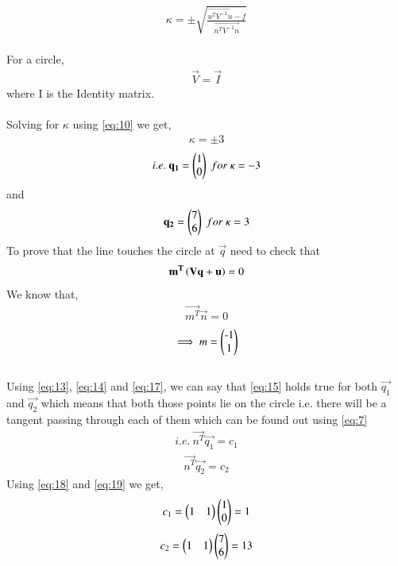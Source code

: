 \documentclass[journal,12pt,twocolumn]{IEEEtran}
\begin{document}
\begin{align}
\kappa = \pm \sqrt{\frac{\vec{u^TV^{-1}u}-f}{\vec{n^TV^{-1}n}}} \label{eq:10}
\end{align}\\
For a circle,
\begin{align}
\vec{V} = \vec{I} \label{eq:11}
\end{align}
where I is the Identity matrix.\\\\
Solving for $\kappa$ using \eqref{eq:10} we get,
\begin{align}
\kappa = \pm 3 \label{eq:12}
\end{align}
\begin{align}
i.e. \ \mathbf{q_1} = \begin{pmatrix}1 \\ 0\end{pmatrix} \ for \ \kappa = -3 \label{eq:13}
\end{align}
and
\begin{align}
\mathbf{q_2} = \begin{pmatrix}7 \\ 6\end{pmatrix} \ for \ \kappa = 3 \label{eq:14}
\end{align}
To prove that the line touches the circle at $\vec{q}$ need to check that
\begin{align}
\mathbf{m^T}\left(\mathbf{V}\mathbf{q}+\mathbf{u}\right) = 0 \label{eq:15}
\end{align}
We know that,
\begin{align}
\vec{m^T}\vec{n} = 0 \label{eq:16}
\end{align}
\begin{align}
\implies m = \myvec{$-$1 \\ 1} \label{eq:17} 
\end{align}\\
Using \eqref{eq:13}, \eqref{eq:14} and \eqref{eq:17}, we can say that \eqref{eq:15} holds true for both $\vec{q_1}$ and $\vec{q_2}$ which means that both those points lie on the circle i.e. there will be a tangent passing through each of them which can be found out using \eqref{eq:7}
\begin{align}
i.e. \ \vec{n^T}\vec{q_1} = c_1 \label{eq:18}
\end{align}
\begin{align}
\vec{n^T}\vec{q_2} = c_2 \label{eq:19}
\end{align}
Using \eqref{eq:18} and \eqref{eq:19} we get, 
\begin{align}
c_1 =  \begin{pmatrix}1 & 1\end{pmatrix}\begin{pmatrix}1 \\ 0\end{pmatrix} = 1 \label{eq:20}
\end{align}
\begin{align}
c_2 = \begin{pmatrix}1 & 1\end{pmatrix}\begin{pmatrix}7 \\ 6\end{pmatrix} = 13 \label{eq:21}
\end{align}
\end{document}
